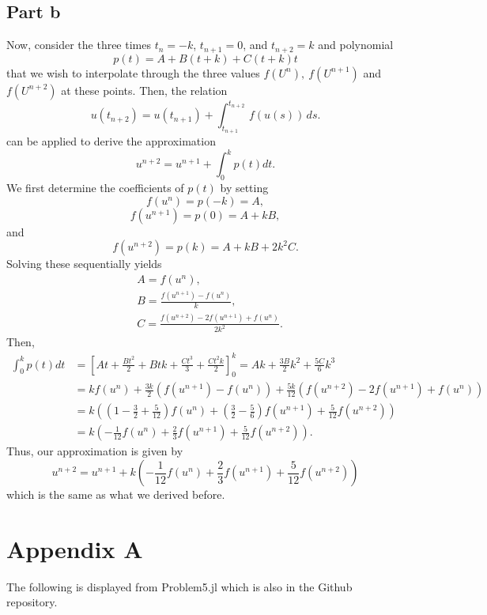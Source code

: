 \documentclass{article}
\begin{document}
\subsection{Part b}
Now, consider the three
times $t_n=-k$, $t_{n+1}=0$, and $t_{n+2}=k$ and polynomial
\[
p(t) = A + B(t+k) + C(t+k)t
\]
that we wish to interpolate through the three values
$f(U^n),~f(U^{n+1})$ and $f(U^{n+2})$ at these points. Then, the relation
\[
u(t_{n+2}) = u(t_{n+1}) + \int_{t_{n+1}}^{t_{n+2}}\,f(u(s))\,ds.
\]
can be applied to derive the approximation
\[
u^{n+2}=u^{n+1}+\int_{0}^{k}p(t)dt.
\]
We first determine the coefficients of $p(t)$ by setting
\[
f(u^n)=p(-k)=A,
\]
\[
f(u^{n+1})=p(0)=A+kB,
\]
and
\[
f(u^{n+2})=p(k)=A+kB+2k^2C.
\]
Solving these sequentially yields
\begin{align*}
&A = f(u^n),\\
&B=\frac{f(u^{n+1})-f(u^n)}{k},\\
&C=\frac{f(u^{n+2})-2f(u^{n+1})+f(u^n)}{2k^2}.
\end{align*}
Then,
\begin{align*}
\int_{0}^{k}p(t)dt&=\left[At+\frac{Bt^2}{2}+Btk+\frac{Ct^3}{3}+\frac{Ct^2k}{2}\right]_0^k=Ak+\frac{3B}{2}k^2+\frac{5C}{6}k^3\\&=
kf(u^n)+\frac{3k}{2}(f(u^{n+1})-f(u^n))+\frac{5k}{12}(f(u^{n+2})-2f(u^{n+1})+f(u^n))\\&=
k\left(\left(1-\frac{3}{2}+\frac{5}{12}\right)f(u^n)+\left(\frac{3}{2}-\frac{5}{6}\right)f(u^{n+1})+\frac{5}{12}f(u^{n+2})\right)\\&=
k\left(-\frac{1}{12}f(u^n)+\frac{2}{3}f(u^{n+1})+\frac{5}{12}f(u^{n+2})\right).
\end{align*}
Thus, our approximation is given by
\[
u^{n+2}=u^{n+1}+k\left(-\frac{1}{12}f(u^n)+\frac{2}{3}f(u^{n+1})+\frac{5}{12}f(u^{n+2})\right)
\]
which is the same as what we derived before. 

\section{Appendix A}
The following is displayed from Problem5.jl which is also in the Github repository. 
\end{document}
